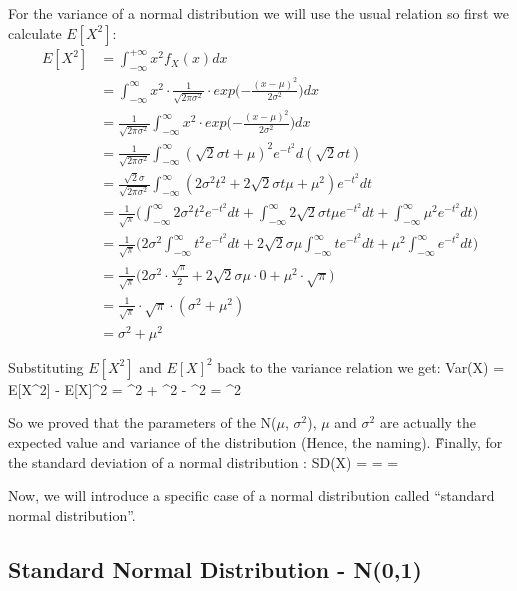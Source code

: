 For the variance of a normal distribution we will use the usual relation so first we calculate $E[X^2]$:
\begingroup
\allowdisplaybreaks
{\setlength{\jot}{11pt}
\begin{align*}
E[X^2] &= \int_{-\infty}^{+\infty} x^2 f_{X}(x) dx \\
&= \int_{-\infty}^\infty x^2 \cdot \frac{1}{\sqrt{2\pi\sigma^2}}
\cdot exp \Big( {-\frac{(x - \mu)^2}{2\sigma^2}} \Big) dx \\
&= \frac{1}{\sqrt{2\pi\sigma^2}} \int_{-\infty}^\infty x^2 \cdot exp \Big( {-\frac{(x - \mu)^2}{2\sigma^2}} \Big) dx\\
&= \frac{1}{\sqrt{2\pi\sigma^2}} \int_{-\infty}^\infty (\sqrt{2} \sigma t + \mu)^2 e^{-t^2} d (\sqrt{2} \sigma t) \\
&= \frac{\sqrt{2} \sigma}{\sqrt{2\pi\sigma^2}} \int_{-\infty}^\infty (2 \sigma^2 t^2
+ 2 \sqrt{2} \sigma t \mu + \mu^2) e ^ {-t^2} dt\\
&= \frac{1}{\sqrt{\pi}} \Big( \int_{-\infty}^\infty 2 \sigma^2 t^2 e^ {-t^2} dt
+ \int_{-\infty}^\infty 2 \sqrt{2} \sigma t \mu e ^ {-t^2} dt + \int_{-\infty}^\infty \mu^2 e^ {-t^2} dt \Big) \\
&= \frac{1}{\sqrt{\pi}} \Big( 2 \sigma^2 \int_{-\infty}^\infty t^2 e^ {-t^2} dt
+ 2 \sqrt{2} \sigma \mu \int_{-\infty}^\infty t e ^ {-t^2} dt + \mu^2 \int_{-\infty}^\infty e ^ {-t^2} dt \Big) \\
&= \frac{1}{\sqrt{\pi}} \Big( 2 \sigma^2 \cdot \frac{\sqrt{\pi}}{2} + 2 \sqrt{2} \sigma \mu \cdot 0
+ \mu^2 \cdot \sqrt{\pi} \Big) \\
&= \frac{1}{\sqrt{\pi}} \cdot \sqrt{\pi} \cdot (\sigma^2 + \mu^2 )\\
&= \sigma^2 + \mu^2
\end{align*}}
\endgroup

Substituting $E[X^2]$ and $E[X]^2$ back to the variance relation we get:
\bse
Var(X) = E[X^2] - E[X]^2 = \sigma^2 + \mu^2 - \mu^2 = \sigma^2
\ese

So we proved that the parameters of the N($\mu$, $\sigma^2$), $\mu$ and $\sigma^2$ are actually the expected value
and variance of the distribution (Hence, the naming). \v

Finally, for the standard deviation of a normal distribution :
\bse
SD(X) =  =  = \sigma
\ese

Now, we will introduce a specific case of a normal distribution called ``standard normal distribution''.

\subsection{Standard Normal Distribution - N(0,1)}

